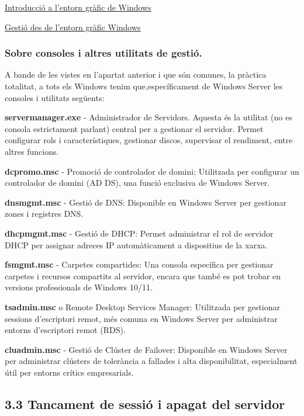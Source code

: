 \documentclass[
  a4paper,
]{article}
\begin{document}
\href{https://tofermos.github.io/Windows11/interfaces/interfaces.html}{Introducció
a l'entorn gràfic de Windows}

\href{https://tofermos.github.io/Windows11/gestiodelequip/gestiodelequip.html}{Gestió
des de l'entorn gràfic Windows}

\subsubsection{Sobre consoles i altres utilitats de
gestió.}\label{sobre-consoles-i-altres-utilitats-de-gestiuxf3.}

A bande de les vistes en l'apartat anterior i que són comunes, la
pràctica totalitat, a tots els Windows tenim que,específicament de
Windows Server les consoles i utilitats següents:

\textbf{servermanager.exe} - Administrador de Servidors. Aquesta és la
utilitat (no es consola estrictament parlant) central per a gestionar el
servidor. Permet configurar rols i característiques, gestionar discos,
supervisar el rendiment, entre altres funcions.

\textbf{dcpromo.msc} - Promoció de controlador de domini: Utilitzada per
configurar un controlador de domini (AD DS), una funció exclusiva de
Windows Server.

\textbf{dnsmgmt.msc} - Gestió de DNS: Disponible en Windows Server per
gestionar zones i registres DNS.

\textbf{dhcpmgmt.msc} - Gestió de DHCP: Permet administrar el rol de
servidor DHCP per assignar adreces IP automàticament a dispositius de la
xarxa.

\textbf{fsmgmt.msc} - Carpetes compartides: Una consola específica per
gestionar carpetes i recursos compartits al servidor, encara que també
es pot trobar en versions professionals de Windows 10/11.

\textbf{tsadmin.msc} o Remote Desktop Services Manager: Utilitzada per
gestionar sessions d'escriptori remot, més comuna en Windows Server per
administrar entorns d'escriptori remot (RDS).

\textbf{cluadmin.msc} - Gestió de Clúster de Failover: Disponible en
Windows Server per administrar clústers de tolerància a fallades i alta
disponibilitat, especialment útil per entorns crítics empresarials.

\subsection{3.3 Tancament de sessió i apagat del
servidor}\label{tancament-de-sessiuxf3-i-apagat-del-servidor}
\end{document}

